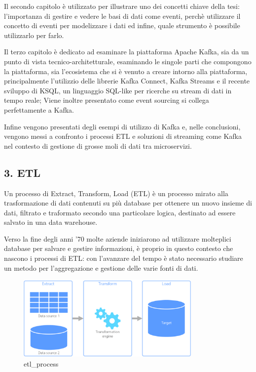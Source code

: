 \documentclass[]{article}
\begin{document}
Il secondo capitolo è utilizzato per illustrare uno dei concetti chiave
della tesi: l'importanza di gestire e vedere le basi di dati come
eventi, perchè utilizzare il concetto di eventi per modelizzare i dati
ed infine, quale strumento è possibile utilizzarlo per farlo.

Il terzo capitolo è dedicato ad esaminare la piattaforma Apache Kafka,
sia da un punto di vista tecnico-architetturale, esaminando le singole
parti che compongono la piattaforma, sia l'ecosistema che si è venuto a
creare intorno alla piattaforma, principalmente l'utilizzio delle
librerie Kafka Connect, Kafka Streams e il recente sviluppo di KSQL, un
linguaggio SQL-like per ricerche su stream di dati in tempo reale; Viene
inoltre presentato come event sourcing si collega perfettamente a Kafka.

Infine vengono presentati degli esempi di utilizzo di Kafka e, nelle
conclusioni, vengono messi a confronto i processi ETL e soluzioni di
streaming come Kafka nel contesto di gestione di grosse moli di dati tra
microservizi.

\newpage

\hypertarget{etl}{\subsection{3. ETL}\label{etl}}

Un processo di Extract, Transform, Load (ETL) è un processo mirato alla
trasformazione di dati contenuti su più database per ottenere un nuovo
insieme di dati, filtrato e traformato secondo una particolare logica,
destinato ad essere salvato in una data warehouse.

Verso la fine degli anni '70 molte aziende iniziarono ad utilizzare
molteplici database per salvare e gestire informazioni, è proprio in
questo contesto che nascono i processi di ETL: con l'avanzare del tempo
è stato necessario studiare un metodo per l'aggregazione e gestione
delle varie fonti di dati.

\begin{figure}
\centering
\includegraphics[width=0.80000\textwidth]{../images/etl.png}
\caption{etl\_process \label{figure_4}}
\end{figure}
\end{document}
